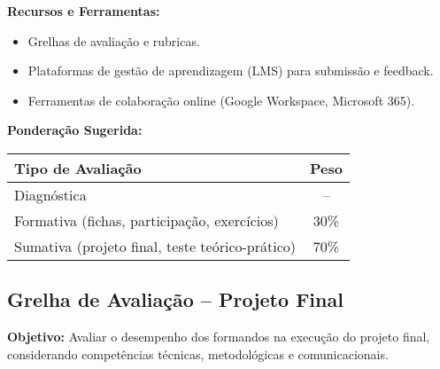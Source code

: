 \documentclass[12pt]{article}
\begin{document}
\textbf{Recursos e Ferramentas:}
\begin{itemize}
  \item Grelhas de avaliação e rubricas.
  \item Plataformas de gestão de aprendizagem (LMS) para submissão e feedback.
  \item Ferramentas de colaboração online (Google Workspace, Microsoft 365).
\end{itemize}

\textbf{Ponderação Sugerida:}
\begin{center}
\begin{tabular}{l c}
\toprule
\textbf{Tipo de Avaliação} & \textbf{Peso} \\
\midrule
Diagnóstica & -- \\
Formativa (fichas, participação, exercícios) & 30\% \\
Sumativa (projeto final, teste teórico-prático) & 70\% \\
\bottomrule
\end{tabular}
\end{center}






%

\subsection*{Grelha de Avaliação – Projeto Final}

\textbf{Objetivo:} Avaliar o desempenho dos formandos na execução do projeto final, considerando competências técnicas, metodológicas e comunicacionais.
\end{document}
